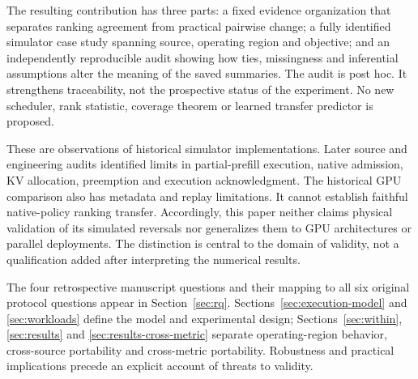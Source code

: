 The resulting contribution has three parts: a fixed evidence organization
that separates ranking agreement from practical pairwise change; a fully
identified simulator case study spanning source, operating region and
objective; and an independently reproducible audit showing how ties,
missingness and inferential assumptions alter the meaning of the saved
summaries. The audit is post hoc. It strengthens traceability, not the
prospective status of the experiment. No new scheduler, rank statistic,
coverage theorem or learned transfer predictor is proposed.

These are observations of historical simulator implementations. Later
source and engineering audits identified limits in partial-prefill
execution, native admission, KV allocation, preemption and execution
acknowledgment. The historical GPU comparison also has metadata and replay
limitations. It cannot establish faithful native-policy ranking transfer.
Accordingly, this paper neither claims physical validation of its simulated
reversals nor generalizes them to GPU architectures or parallel deployments.
The distinction is central to the domain of validity, not a qualification
added after interpreting the numerical results.

The four retrospective manuscript questions and their mapping to all six
original protocol questions appear in
Section~\ref{sec:rq}. Sections~\ref{sec:execution-model} and
\ref{sec:workloads} define the model and experimental design;
Sections~\ref{sec:within}, \ref{sec:results} and
\ref{sec:results-cross-metric} separate operating-region behavior,
cross-source portability and cross-metric portability. Robustness and
practical implications precede an explicit account of threats to validity.
